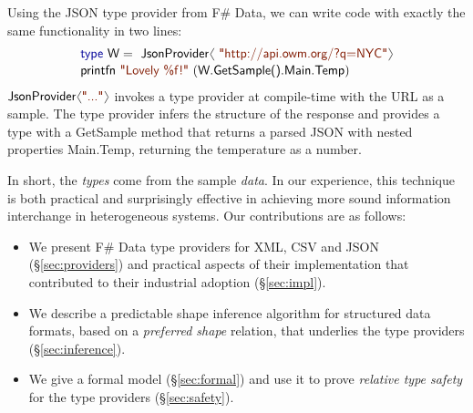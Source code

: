 \documentclass[pldi-cameraready]{sigplanconf-pldi16}
\newcommand{\langl}{\begin{picture}(4.5,7)
\put(1.1,2.5){\rotatebox{60}{\line(1,0){5.5}}}
\put(1.1,2.5){\rotatebox{300}{\line(1,0){5.5}}}
\end{picture}}
\newcommand{\rangl}{\begin{picture}(4.5,7)
\put(.9,2.5){\rotatebox{120}{\line(1,0){5.5}}}
\put(.9,2.5){\rotatebox{240}{\line(1,0){5.5}}}
\end{picture}}
\newcommand{\kvd}[1]{\textnormal{\textcolor{kvdclr}{\sffamily #1}}}
\newcommand{\str}[1]{\textnormal{\textcolor{strclr}{\sffamily "#1"}}}
\newcommand{\ident}[1]{\textnormal{\sffamily #1}}
\begin{document}
Using the JSON type provider from F\# Data, we can write code with exactly the
same functionality in two lines:
%
\begin{equation*}
\begin{array}{l}
 \kvd{type}~\ident{W} = \ident{JsonProvider}\langl\str{http://api.owm.org/?q=NYC}\rangl \\[0.1em]
 \ident{printfn}~\str{Lovely \%f!}~(\ident{W.GetSample().Main.Temp})
\end{array}
\end{equation*}
%
$\ident{JsonProvider}\langl\str{...}\rangl$ invokes a type provider \cite{fsharp-typeprov} at
compile-time with the URL as a sample. The type provider infers the structure of the response
and provides a type with a \ident{GetSample} method that returns a parsed JSON with nested
properties \ident{Main.Temp}, returning the temperature as a number.

In short, the \emph{types} come from the sample \emph{data}. In our experience, this technique is
both practical and surprisingly effective in achieving more sound information interchange
in heterogeneous systems. Our contributions are as follows:

\begin{itemize}
\item We present F\# Data type providers for XML, CSV and JSON (\S\ref{sec:providers})
  and practical aspects of their implementation that contributed to their industrial
  adoption (\S\ref{sec:impl}).

\item We describe a predictable shape inference algorithm for structured data formats,
  based on a \emph{preferred shape} relation, that underlies the type providers
  (\S\ref{sec:inference}).

\item We give a formal model (\S\ref{sec:formal}) and use it to prove
  \emph{relative type safety} for the type providers (\S\ref{sec:safety}).
\end{itemize}



%
%
\end{document}
